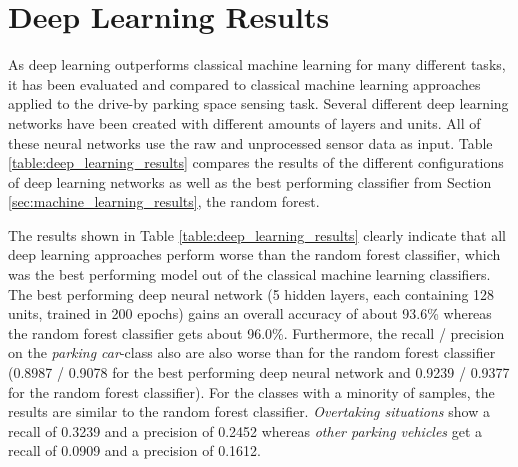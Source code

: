 



\section{Deep Learning Results}
\label{sec:deep_learning_results}

As deep learning outperforms classical machine learning for many different tasks, it has been evaluated and compared to classical machine learning approaches applied to the drive-by parking space sensing task. Several different deep learning networks have been created with different amounts of layers and units. All of these neural networks use the raw and unprocessed sensor data as input. Table \ref{table:deep_learning_results} compares the results of the different configurations of deep learning networks as well as the best performing classifier from Section \ref{sec:machine_learning_results}, the random forest. 


The results shown in Table \ref{table:deep_learning_results} clearly indicate that all deep learning approaches perform worse than the random forest classifier, which was the best performing model out of the classical machine learning classifiers. The best performing deep neural network (5 hidden layers, each containing 128 units, trained in 200 epochs) gains an overall accuracy of about 93.6\% whereas the random forest classifier gets about 96.0\%. Furthermore, the recall / precision on the \emph{parking car}-class also are also worse than for the random forest classifier (0.8987 / 0.9078 for the best performing deep neural network and 0.9239 / 0.9377 for the random forest classifier). For the classes with a minority of samples, the results are similar to the random forest classifier. \emph{Overtaking situations} show a recall of 0.3239 and a precision of 0.2452 whereas \emph{other parking vehicles} get a recall of 0.0909 and a precision of 0.1612.

